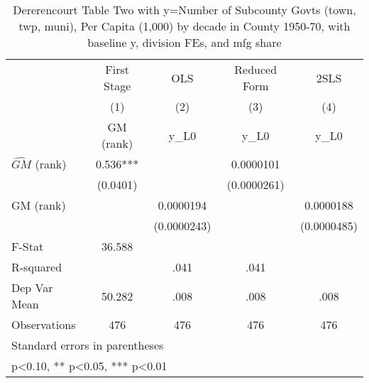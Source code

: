 \begin{table}[htbp]\centering
\def\sym#1{\ifmmode^{#1}\else\(^{#1}\)\fi}
\caption{Dererencourt Table Two with y=Number of Subcounty Govts (town, twp, muni), Per Capita (1,000) by decade in County 1950-70, with baseline y, division FEs, and mfg share}
\begin{tabular}{l*{4}{c}}
\toprule
                    & First Stage   &         OLS   &Reduced Form   &        2SLS   \\
                    &\multicolumn{1}{c}{(1)}&\multicolumn{1}{c}{(2)}&\multicolumn{1}{c}{(3)}&\multicolumn{1}{c}{(4)}\\
                    &\multicolumn{1}{c}{GM  (rank)}&\multicolumn{1}{c}{y\_L0}&\multicolumn{1}{c}{y\_L0}&\multicolumn{1}{c}{y\_L0}\\
\midrule
$\hat{GM}$ (rank)   &       0.536***&               &   0.0000101   &               \\
                    &    (0.0401)   &               & (0.0000261)   &               \\
\addlinespace
GM  (rank)          &               &   0.0000194   &               &   0.0000188   \\
                    &               & (0.0000243)   &               & (0.0000485)   \\
\midrule
F-Stat              &      36.588   &               &               &               \\
R-squared           &               &        .041   &        .041   &               \\
Dep Var Mean        &      50.282   &        .008   &        .008   &        .008   \\
Observations        &         476   &         476   &         476   &         476   \\
\bottomrule
\multicolumn{5}{l}{\footnotesize Standard errors in parentheses}\\
\multicolumn{5}{l}{\footnotesize * p<0.10, ** p<0.05, *** p<0.01}\\
\end{tabular}
\end{table}
